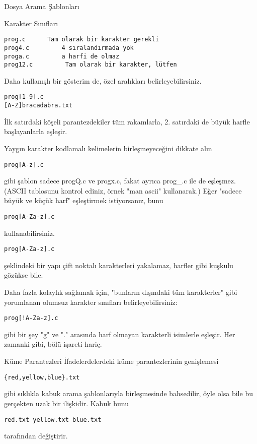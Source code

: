 \begin{section}{Dosya Arama Şablonları}
\begin{subsection}{Karakter Sınıfları}
\begin{verbatim}
prog.c 		Tam olarak bir karakter gerekli
prog4.c 		4 sıralandırmada yok
proga.c 		a harfi de olmaz
prog12.c		 Tam olarak bir karakter, lütfen
\end{verbatim}
Daha kullanışlı bir gösterim de, özel aralıkları belirleyebilirsiniz.
\begin{verbatim}
prog[1-9].c
[A-Z]bracadabra.txt
\end{verbatim}
İlk satırdaki köşeli parantezdekiler tüm rakamlarla, 2. satırdaki de büyük harfle başlayanlarla eşleşir.

Yaygın karakter kodlamalı kelimelerin birleşmeyeceğini dikkate alın
\begin{verbatim}
prog[A-z].c
\end{verbatim}
gibi şablon sadece progQ.c ve progx.c, fakat ayrıca prog\_.c ile de eşleşmez.(ASCII tablosunu kontrol ediniz, örnek "man ascii" kullanarak.) Eğer "sadece büyük ve küçük harf" eşleştirmek istiyorsanız, bunu

\begin{verbatim}
prog[A-Za-z].c
\end{verbatim}
kullanabilirsiniz.
\begin{verbatim}
prog[A-Za-z].c
\end{verbatim}
şeklindeki bir yapı çift noktalı karakterleri yakalamaz, harfler gibi kuşkulu gözükse bile.

Daha fazla kolaylık sağlamak için, "bunların dışındaki tüm karakterler" gibi yorumlanan olumsuz karakter sınıfları belirleyebilirsiniz: 
\begin{verbatim}
prog[!A-Za-z].c
\end{verbatim}
gibi bir şey "g" ve "." arasında harf olmayan karakterli isimlerle eşleşir. Her zamanki gibi, bölü işareti hariç.

\end{subsection}
\begin{subsection}{Küme Parantezleri}
İfadelerdelerdeki küme parantezlerinin genişlemesi
\begin{verbatim}
{red,yellow,blue}.txt
\end{verbatim}
gibi sıklıkla kabuk arama şablonlarıyla birleşmesinde bahsedilir, öyle olsa bile bu gerçekten uzak bir ilişkidir. Kabuk bunu
\begin{verbatim}
red.txt yellow.txt blue.txt
\end{verbatim}
tarafından değiştirir.


\end{subsection}
\end{section}
